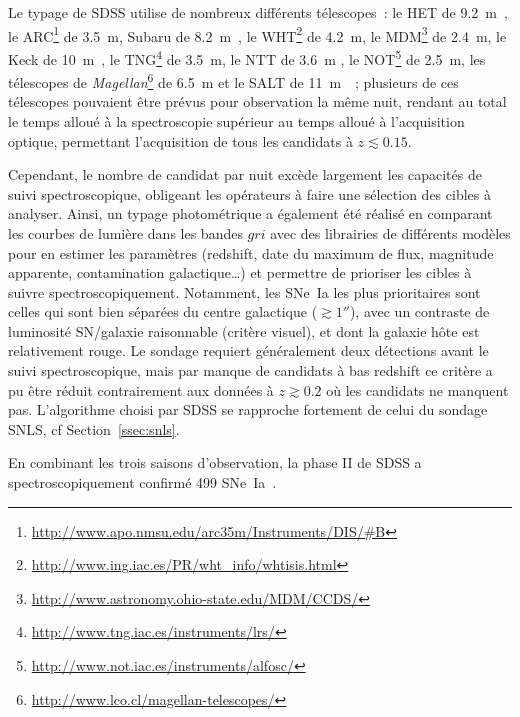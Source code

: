 \documentclass[../main/main.tex]{subfiles}
\begin{document}
Le typage de SDSS utilise de nombreux différents télescopes~: le HET de
\SI{9.2}{m}~\citep{hill1998}, le
ARC\footnote{\href{http://www.apo.nmsu.edu/arc35m/Instruments/DIS/\#B}
{http://www.apo.nmsu.edu/arc35m/Instruments/DIS/\#B}} de \SI{3.5}{m}, Subaru de
\SI{8.2}{m}~\citep{kashikawa2000}, le
WHT\footnote{\href{http://www.ing.iac.es/PR/wht_info/whtisis.html}
{http://www.ing.iac.es/PR/wht\_info/whtisis.html}} de \SI{4.2}{m}, le
MDM\footnote{\href{http://www.astronomy.ohio-state.edu/MDM/CCDS/}
{http://www.astronomy.ohio-state.edu/MDM/CCDS/}} de \SI{2.4}{m}, le Keck de
\SI{10}{m}~\citep{oke1995}, le
TNG\footnote{\href{http://www.tng.iac.es/instruments/lrs/}
{http://www.tng.iac.es/instruments/lrs/}} de \SI{3.5}{m}, le NTT de \SI{3.6}{m}
\citep{dekker1986}, le
NOT\footnote{\href{http://www.not.iac.es/instruments/alfosc/}
{http://www.not.iac.es/instruments/alfosc/}} de \SI{2.5}{m}, les télescopes de
\textit{Magellan}\footnote{\href{http://www.lco.cl/magellan-telescopes/}
{http://www.lco.cl/magellan-telescopes/}} de \SI{6.5}{m} et le SALT de
\SI{11}{m}~\citep{burgh2003}~; plusieurs de ces télescopes pouvaient être prévus
pour observation la même nuit, rendant au total le temps alloué à la
spectroscopie supérieur au temps alloué à l'acquisition optique, permettant
l'acquisition de tous les candidats à $z \lesssim 0.15$.

Cependant, le nombre de candidat par nuit excède largement les capacités de
suivi spectroscopique, obligeant les opérateurs à faire une sélection des cibles
à analyser. Ainsi, un typage photométrique a également été réalisé en comparant
les courbes de lumière dans les bandes $gri$ avec des librairies de différents
modèles pour en estimer les paramètres (redshift, date du maximum de flux,
magnitude apparente, contamination galactique…) et permettre de prioriser les
cibles à suivre spectroscopiquement. Notamment, les SNe~Ia les plus prioritaires
sont celles qui sont bien séparées du centre galactique ($\gtrsim \ang{;;1}$),
avec un contraste de luminosité SN/galaxie raisonnable (critère visuel), et dont
la galaxie hôte est relativement rouge. Le sondage requiert généralement deux
détections avant le suivi spectroscopique, mais par manque de candidats à bas
redshift ce critère a pu être réduit contrairement aux données à $z \gtrsim 0.2$
où les candidats ne manquent pas. L'algorithme choisi par SDSS se rapproche
fortement de celui du sondage SNLS, cf Section~\ref{ssec:snls}.

En combinant les trois saisons d'observation, la phase II de SDSS a
spectroscopiquement confirmé 499 SNe~Ia~\citep{sako2018}.
\end{document}
